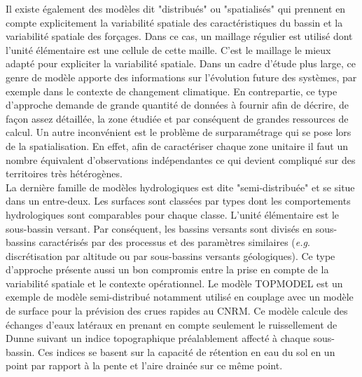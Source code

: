 Il existe également des modèles dit "distribués" ou "spatialisés" qui prennent en compte explicitement la variabilité spatiale des caractéristiques du bassin et la variabilité spatiale des forçages. Dans ce cas, un maillage régulier est utilisé dont l'unité élémentaire est une cellule de cette maille. C'est le maillage le mieux adapté pour expliciter la variabilité spatiale. Dans un cadre d'étude plus large, ce genre de modèle apporte des informations sur l'évolution future des systèmes, par exemple dans le contexte de changement climatique. En contrepartie, ce type d'approche demande de grande quantité de données à fournir afin de décrire, de façon assez détaillée, la zone étudiée et par conséquent de grandes ressources de calcul. Un autre inconvénient est le problème de surparamétrage qui se pose lors de la spatialisation. En effet, afin de caractériser chaque zone unitaire il faut un nombre équivalent d'observations indépendantes ce qui devient compliqué sur des territoires très hétérogènes.\\

La dernière famille de modèles hydrologiques est dite "semi-distribuée" et se situe dans un entre-deux. Les surfaces sont classées par types dont les comportements hydrologiques sont comparables pour chaque classe. L'unité élémentaire est le sous-bassin versant. Par conséquent, les bassins versants sont divisés en sous-bassins caractérisés par des processus et des paramètres similaires (\textit{e.g}. discrétisation par altitude ou par sous-bassins versants géologiques). Ce type d'approche présente aussi un bon compromis entre la prise en compte de la variabilité spatiale et le contexte opérationnel. Le modèle TOPMODEL \citep[TOPography based hydrological MODEL,][]{beven1979} est un exemple de modèle semi-distribué notamment utilisé en couplage avec un modèle de surface pour la prévision des crues rapides au CNRM. Ce modèle calcule des échanges d'eaux latéraux en prenant en compte seulement le ruissellement de Dunne suivant un indice topographique préalablement affecté à chaque sous-bassin. Ces indices se basent sur la capacité de rétention en eau du sol en un point par rapport à la pente et l'aire drainée sur ce même point. \\

